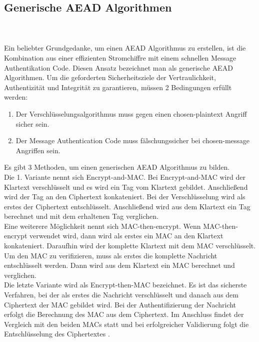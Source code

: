 \subsection{Generische AEAD Algorithmen}
\\
\\
Ein beliebter Grundgedanke, um einen \gls{AEAD} Algorithmus zu erstellen, ist die Kombination aus einer effizienten Stromchiffre mit einem schnellen Message Authentikation Code. Diesen Ansatz bezeichnet man als generische \gls{AEAD} Algorithmen. Um die geforderten Sicherheitsziele der Vertraulichkeit, Authentizität und Integrität zu garantieren, müssen 2 Bedingungen erfüllt werden:
\begin{enumerate}
\item Der Verschlüsselungsalgorithmus muss gegen einen chosen-plaintext Angriff sicher sein.
\item Der Message Authentication Code muss fälschungssicher bei chosen-message Angriffen sein.
\end{enumerate} 
Es gibt 3 Methoden, um einen generischen \gls{AEAD} Algorithmus zu bilden. \\
Die 1. Variante nennt sich Encrypt-and-MAC. Bei Encrypt-and-MAC wird der Klartext verschlüsselt und es wird ein Tag vom Klartext gebildet. Anschließend wird der Tag an den Ciphertext konkateniert. Bei der Verschlüsselung wird als erstes der Ciphertext entschlüsselt. Anschließend wird aus dem Klartext ein Tag berechnet und mit dem erhaltenen Tag verglichen. \\Eine weiterere Möglichkeit nennt sich MAC-then-encrypt. Wenn MAC-then-encrypt verwendet wird, dann wird als erstes ein MAC an den Klartext konkateniert. Daraufhin wird der komplette Klartext mit dem MAC verschlüsselt. Um den MAC zu verifizieren, muss als erstes die komplette Nachricht entschlüsselt werden. Dann wird aus dem Klartext ein MAC berechnet und verglichen.\\
Die letzte Variante wird als Encrypt-then-MAC bezeichnet. Es ist das sicherste Verfahren, bei der als erstes die Nachricht verschlüsselt und danach aus dem Ciphertext der MAC gebildet wird. Bei der Authentifizierung der Nachricht erfolgt die Berechnung des MAC aus dem Ciphertext. Im Anschluss findet der Vergleich mit den beiden MACs statt und bei erfolgreicher Validierung folgt die Entschlüsselung des Ciphertextes \cite{10.1007/3-540-44448-3_41}. 
\\
\\

